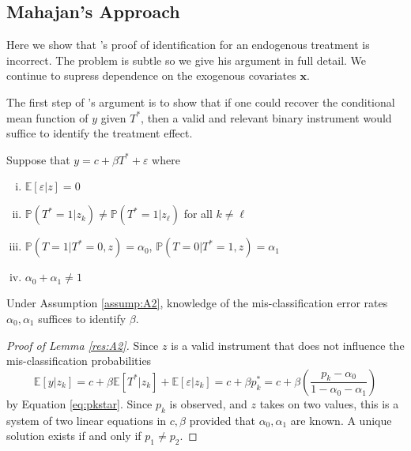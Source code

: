 \subsection{Mahajan's Approach}
Here we show that \citeauthor{Mahajan}'s proof of identification for an endogenous treatment is incorrect.
The problem is subtle so we give his argument in full detail.
We continue to supress dependence on the exogenous covariates $\mathbf{x}$.

The first step of \citeauthor{Mahajan}'s argument is to show that if one could recover the conditional mean function of $y$ given $T^*$, then a valid and relevant binary instrument would suffice to identify the treatment effect.  
\begin{assump}[Mahajan A2]\mbox{}
  \label{assump:A2} Suppose that $y = c+ \beta T^* + \varepsilon$ where
  \begin{enumerate}[(i)]
    \item $\mathbb{E}[\varepsilon|z]=0$
    \item $\mathbb{P}(T^*=1|z_k)\neq \mathbb{P}(T^*=1|z_\ell)$ for all $k\neq \ell$
    \item $\mathbb{P}(T = 1| T^* = 0, z) = \alpha_0$, $\mathbb{P}(T = 0| T^* = 1, z) = \alpha_1$
    \item $\alpha_0 + \alpha_1 \neq 1$
  \end{enumerate}
\end{assump}

\begin{lem}[Mahajan A2]
  \label{res:A2}
Under Assumption \ref{assump:A2}, knowledge of the mis-classification error rates $\alpha_0, \alpha_1$ suffices to identify $\beta$.
\end{lem}
\begin{proof}[Proof of Lemma \ref{res:A2}]
Since $z$ is a valid instrument that does not influence the mis-classification probabilities
\[\mathbb{E}[y|z_k] = c + \beta \mathbb{E}[T^*|z_k] + \mathbb{E}[\varepsilon|z_k] = c + \beta p_k^* = c + \beta \left( \frac{p_k - \alpha_0}{1 - \alpha_0 - \alpha_1} \right)\]
by Equation \ref{eq:pkstar}.
Since $p_k$ is observed, and $z$ takes on two values, this is a system of two linear equations in $c,\beta$ provided that $\alpha_0,\alpha_1$ are known.
A unique solution exists if and only if $p_1 \neq p_2$.
\end{proof}

